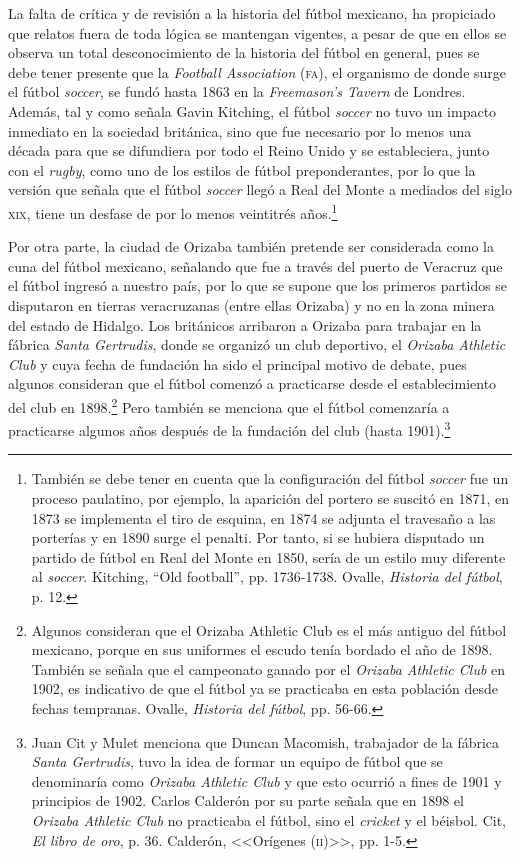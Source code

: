 \documentclass[11pt,a5paper,twoside]{book} %
\begin{document}
La falta de crítica y de revisión a la historia del fútbol mexicano, ha propiciado que
relatos fuera de toda lógica se mantengan vigentes, a pesar de que en ellos se observa un total
desconocimiento de la historia del fútbol en general, pues se debe tener presente que la
\emph{Football Association} (\textsc{fa}), el organismo de donde surge el fútbol \emph{soccer}, se fundó hasta 1863 en la \emph{Freemason's Tavern} de Londres. Además, tal y como señala Gavin Kitching, el fútbol
\emph{soccer} no tuvo un impacto inmediato en la sociedad británica, sino que fue necesario por lo
menos una década para que se difundiera por todo el Reino Unido y se estableciera, junto
con el \emph{rugby}, como uno de los estilos de fútbol preponderantes, por lo que la versión que
señala que el fútbol \emph{soccer} llegó a Real del Monte a mediados del siglo \textsc{xix}, tiene un desfase
de por lo menos veintitrés años.\footnote{También se debe tener en cuenta que la configuración del fútbol \emph{soccer} fue un proceso paulatino, por ejemplo, la aparición del portero se suscitó en 1871, en 1873 se implementa el tiro de esquina, en 1874 se adjunta el travesaño a las porterías y en 1890 surge el penalti. Por tanto, si se hubiera disputado un partido de fútbol en Real del Monte en 1850, sería de un estilo muy diferente al \emph{soccer}. Kitching, ``Old football'', pp. 1736-1738. Ovalle, \emph{Historia del fútbol}, p. 12.}

Por otra parte, la ciudad de Orizaba también pretende ser considerada como la cuna
del fútbol mexicano, señalando que fue a través del puerto de Veracruz que el fútbol ingresó
a nuestro país, por lo que se supone que los primeros partidos se disputaron en tierras
veracruzanas (entre ellas Orizaba) y no en la zona minera del estado de Hidalgo. Los británicos arribaron a Orizaba para trabajar en la fábrica \emph{Santa Gertrudis}, donde se organizó un club deportivo, el \emph{Orizaba Athletic Club} y cuya fecha de fundación ha sido el principal motivo de debate, pues algunos consideran que el fútbol comenzó a practicarse desde el establecimiento del club en {1898}.\footnote{Algunos consideran que el Orizaba Athletic Club es el más antiguo del fútbol mexicano, porque en sus uniformes el escudo tenía bordado el año de 1898. También se señala que el campeonato ganado por el \emph{Orizaba Athletic Club} en 1902, es indicativo de que el fútbol ya se practicaba en esta población desde fechas tempranas. Ovalle, \emph{Historia del fútbol}, pp. 56-66.} Pero también se menciona que el fútbol comenzaría a
practicarse algunos años después de la fundación del club (hasta 1901).\footnote{Juan Cit y Mulet menciona que Duncan Macomish, trabajador de la fábrica \emph{Santa Gertrudis}, tuvo la idea de formar un equipo de fútbol que se denominaría como \emph{Orizaba Athletic Club} y que esto ocurrió a fines de 1901 y principios de 1902. Carlos Calderón por su parte señala que en 1898 el \emph{Orizaba Athletic Club} no practicaba el fútbol, sino el \emph{cricket} y el béisbol. Cit, \emph{El libro de oro}, p. 36. Calderón, <<Orígenes (\textsc{ii})>>, pp. 1-5.}
\end{document}
